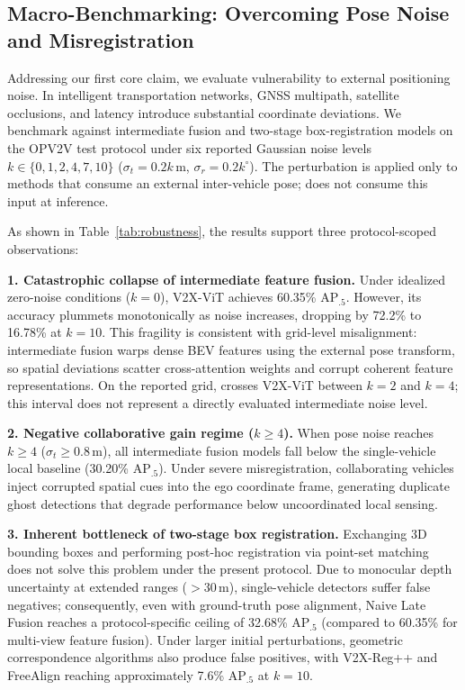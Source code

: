 \subsection{Macro-Benchmarking: Overcoming Pose Noise and Misregistration}
\label{sec:robustness}
Addressing our first core claim, we evaluate vulnerability to external positioning noise. In intelligent transportation networks, GNSS multipath, satellite occlusions, and latency introduce substantial coordinate deviations. We benchmark \method{} against intermediate fusion and two-stage box-registration models on the OPV2V test protocol under six reported Gaussian noise levels $k \in \{0, 1, 2, 4, 7, 10\}$ ($\sigma_t = 0.2k$\,m, $\sigma_r = 0.2k^\circ$). The perturbation is applied only to methods that consume an external inter-vehicle pose; \method{} does not consume this input at inference.

As shown in Table~\ref{tab:robustness}, the results support three protocol-scoped observations:

\textbf{1. Catastrophic collapse of intermediate feature fusion.} Under idealized zero-noise conditions ($k=0$), V2X-ViT achieves 60.35\% AP$_{.5}$. However, its accuracy plummets monotonically as noise increases, dropping by 72.2\% to 16.78\% at $k=10$. This fragility is consistent with grid-level misalignment: intermediate fusion warps dense BEV features using the external pose transform, so spatial deviations scatter cross-attention weights and corrupt coherent feature representations. On the reported grid, \method{} crosses V2X-ViT between $k=2$ and $k=4$; this interval does not represent a directly evaluated intermediate noise level.

\textbf{2. Negative collaborative gain regime ($k \ge 4$).} When pose noise reaches $k \ge 4$ ($\sigma_t \ge 0.8$\,m), all intermediate fusion models fall below the single-vehicle local baseline (30.20\% AP$_{.5}$). Under severe misregistration, collaborating vehicles inject corrupted spatial cues into the ego coordinate frame, generating duplicate ghost detections that degrade performance below uncoordinated local sensing.

\textbf{3. Inherent bottleneck of two-stage box registration.} Exchanging 3D bounding boxes and performing post-hoc registration via point-set matching~\cite{v2xreg,freealign} does not solve this problem under the present protocol. Due to monocular depth uncertainty at extended ranges ($>30$\,m), single-vehicle detectors suffer false negatives; consequently, even with ground-truth pose alignment, Naive Late Fusion reaches a protocol-specific ceiling of 32.68\% AP$_{.5}$ (compared to 60.35\% for multi-view feature fusion). Under larger initial perturbations, geometric correspondence algorithms also produce false positives, with V2X-Reg++ and FreeAlign reaching approximately 7.6\% AP$_{.5}$ at $k=10$.


